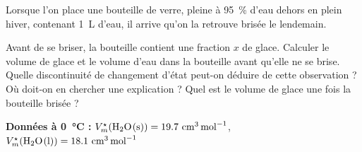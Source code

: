 \begin{exercise}
Lorsque l'on place une bouteille de verre, pleine à \SI{95}{\percent} d'eau dehors en plein hiver, contenant \SI{1}{\liter} d'eau, il arrive qu'on la retrouve brisée le lendemain.
\begin{questions}
\question Avant de se briser, la bouteille contient une fraction $x$ de glace. Calculer le volume de glace et le volume d'eau dans la bouteille avant qu'elle ne se brise.
\question Quelle discontinuité de changement d'état peut-on déduire de cette observation ? Où doit-on en chercher une explication ?
\question Quel est le volume de glace une fois la bouteille brisée ?
\end{questions}
\textbf{Données à \SI{0}{\celsius} : } $V_m^\star (\ce{H2O(s)}) = 19.7 ~ \si{\centi\meter\cubed\per\mole}$, $V_m^\star (\ce{H2O(l)}) = 18.1 ~ \si{\centi\meter\cubed\per\mole}$

\end{exercise}